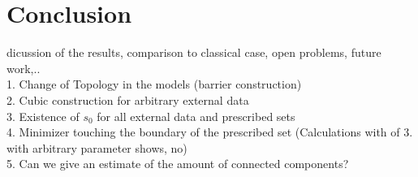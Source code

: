 \chapter{Conclusion}
\label{ch:conclusion}

dicussion of the results, comparison to classical case, open problems, future
work,..\\

1. Change of Topology in the models (barrier construction) \\
2. Cubic construction for arbitrary external data\\
3. Existence of \( s_{0} \) for all external data and prescribed sets\\
4. Minimizer touching the boundary of the prescribed set (Calculations with of 3. with
arbitrary parameter shows, no)\\
5. Can we give an estimate of the amount of connected components?\\